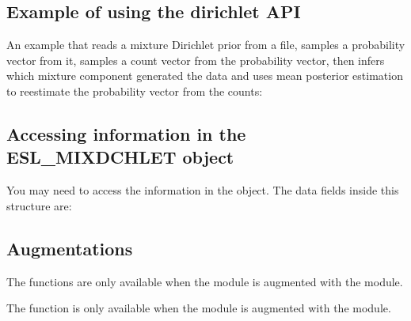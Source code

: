 \subsection{Example of using the dirichlet API}

An example that reads a mixture Dirichlet prior from a file, samples a
probability vector from it, samples a count vector from the
probability vector, then infers which mixture component generated the
data and uses mean posterior estimation to reestimate the probability
vector from the counts:



\subsection{Accessing information in the ESL\_MIXDCHLET object}

You may need to access the information in the 
object. The data fields inside this structure are:




\subsection{Augmentations}

The  functions are only available
when the module is augmented with the  module.

The  function is only available when the
module is augmented with the  module.

